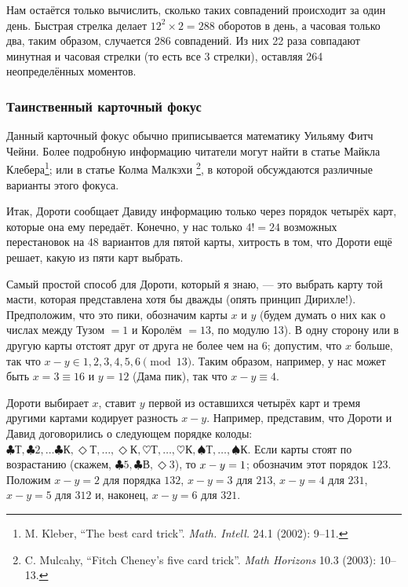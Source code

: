 Нам остаётся только вычислить, сколько таких совпадений происходит за один день.
Быстрая стрелка делает $12^2\times 2 = 288$ оборотов в день, а часовая только два, таким образом, случается 286 совпадений.
Из них 22 раза совпадают минутная и часовая стрелки (то есть все $3$ стрелки), оставляя 264 неопределённых моментов. 
\heart

\subsubsection*{Таинственный карточный фокус}%

Данный карточный фокус обычно приписывается математику Уильяму Фитч Чейни. %
Более подробную информацию читатели могут найти в статье Майкла Клебера\footnote{M. Kleber, ``The best card trick''. \emph{Math. Intell.} 24.1 (2002): 9--11.};
или в статье Колма Малкэхи%
\footnote{C. Mulcahy, ``Fitch Cheney's five card trick''. \emph{Math Horizons} 10.3 (2003): 10--13.}, в которой обсуждаются различные варианты этого фокуса.

\medskip

Итак, Дороти сообщает Давиду информацию только через порядок четырёх карт, которые она ему передаёт.
Конечно, у нас только $4!=24$ возможных перестановок на $48$ вариантов для пятой карты, хитрость в том, что Дороти ещё решает, какую из пяти карт выбрать.

Самый простой способ для Дороти, который я знаю, --- это выбрать карту той масти, которая представлена хотя бы дважды (опять принцип Дирихле!).
Предположим, что это пики, обозначим карты $x$ и $y$ (будем думать о них как о числах между Тузом $=1$ и Королём $=13$, по модулю 13).
В одну сторону или в другую карты отстоят друг от друга не более чем на 6;
допустим, что $x$ больше, так что $x-y\in {1,2,3,4,5,6} \pmod{13}$.
Таким образом, например, у нас может быть $x =3\equiv 16$ и $y = 12$ (Дама пик), так что $x-y\equiv4$.

Дороти выбирает $x$, ставит $y$ первой из оставшихся четырёх карт и тремя другими картами кодирует разность $x-y$.
Например, представим, что Дороти и Давид договорились о следующем порядке колоды: 
$\clubsuit\text{Т},
\clubsuit 2,
\dots
\clubsuit\text{К},
\Diamond\text{Т},
\dots,
\Diamond\text{К},
\heartsuit\text{Т},
\dots,
\heartsuit\text{К},
\spadesuit \text{Т},
\dots,
\spadesuit \text{К}$.
Если карты стоят по возрастанию (скажем, 
$\clubsuit 5,
\clubsuit \text{В},
\Diamond 3$), то $x-y\z=1$; обозначим этот порядок $123$.
Положим $x-y=2$ для порядка $132$,
$x-y=3$ для $213$, $x-y=4$ для $231$, $x-y=5$ для $312$ и, наконец, $x-y=6$ для $321$.

